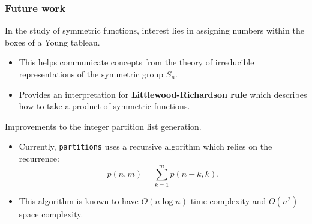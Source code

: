 \documentclass{beamer}
\begin{document}
\begin{frame}
\frametitle{Future work}	
In the study of symmetric functions, interest lies in assigning numbers within the boxes of a Young tableau.

\begin{itemize}
\item This helps communicate concepts from the theory of irreducible representations of the symmetric group $S_n$.
\item Provides an interpretation for \textbf{Littlewood-Richardson rule} which describes how to take a product of symmetric functions.
\end{itemize}

Improvements to the integer partition list generation.
\begin{itemize}
	\item Currently, \texttt{partitions} uses a recursive algorithm which relies on the recurrence:
	$$p(n,m) = \sum_{k=1}^{m}p(n-k, k).$$
	\item This algorithm is known to have $O(n\log n)$ time complexity and $O(n^2)$ space complexity.
\end{itemize}
\end{frame}
\end{document}

